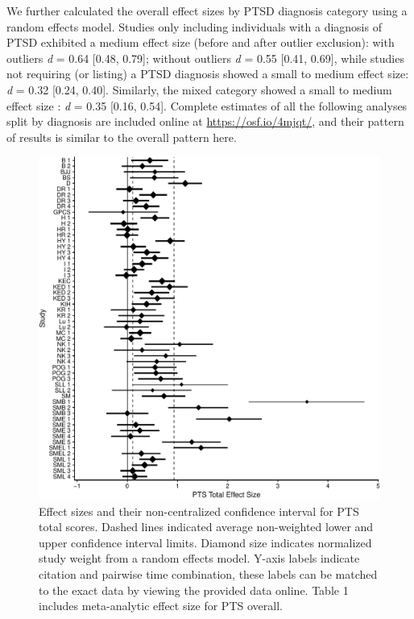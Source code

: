 \documentclass[man]{apa6}
\theoremstyle{definition}
\theoremstyle{definition}
\theoremstyle{definition}
\theoremstyle{remark}
\begin{document}
We further calculated the overall effect sizes by PTSD diagnosis
category using a random effects model. Studies only including
individuals with a diagnosis of PTSD exhibited a medium effect size
(before and after outlier exclusion): with outliers \emph{d} = 0.64
{[}0.48, 0.79{]}; without outliers \emph{d} = 0.55 {[}0.41, 0.69{]},
while studies not requiring (or listing) a PTSD diagnosis showed a small
to medium effect size: \emph{d} = 0.32 {[}0.24, 0.40{]}. Similarly, the
mixed category showed a small to medium effect size : \emph{d} = 0.35
{[}0.16, 0.54{]}. Complete estimates of all the following analyses split
by diagnosis are included online at \url{https://osf.io/4mjqt/}, and
their pattern of results is similar to the overall pattern here.

\begin{figure}[htbp]
\centering
\includegraphics{meta_markdown_files/figure-latex/ptspicoverall-1.pdf}
\caption{\label{fig:ptspicoverall}Effect sizes and their non-centralized
confidence interval for PTS total scores. Dashed lines indicated average
non-weighted lower and upper confidence interval limits. Diamond size
indicates normalized study weight from a random effects model. Y-axis
labels indicate citation and pairwise time combination, these labels can
be matched to the exact data by viewing the provided data online. Table
1 includes meta-analytic effect size for PTS overall.}
\end{figure}
\end{document}
